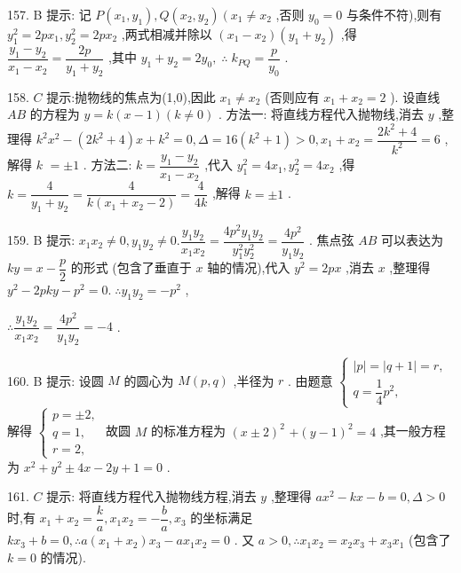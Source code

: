 157. B 提示: 记 $P\left( {{x}_{1},{y}_{1}}\right) ,Q\left( {{x}_{2},{y}_{2}}\right) \left( {{x}_{1} \neq  {x}_{2}}\right.$ ,否则 ${y}_{0} = 0$ 与条件不符),则有 ${y}_{1}^{2} = {2p}{x}_{1},{y}_{2}^{2} = {2p}{x}_{2}$ ,两式相减并除以 $\left( {{x}_{1} - {x}_{2}}\right) \left( {{y}_{1} + {y}_{2}}\right)$ ,得 $\dfrac{{y}_{1} - {y}_{2}}{{x}_{1} - {x}_{2}} = \dfrac{2p}{{y}_{1} + {y}_{2}}$ ,其中 ${y}_{1} + {y}_{2} = 2{y}_{0},\;\therefore \;{k}_{PQ} = \dfrac{p}{{y}_{0}}$ .

158. $C$ 提示:抛物线的焦点为(1,0),因此 ${x}_{1} \neq  {x}_{2}$ (否则应有 ${x}_{1} + {x}_{2} = 2$ ). 设直线 ${AB}$ 的方程为 $y = k\left( {x - 1}\right) \left( {k \neq  0}\right)$ . 方法一: 将直线方程代入抛物线,消去 $y$ ,整理得 ${k}^{2}{x}^{2} - \left( {2{k}^{2} + 4}\right) x + {k}^{2} = 0,\Delta  = {16}\left( {{k}^{2} + 1}\right)  > 0,{x}_{1} + {x}_{2} = \dfrac{2{k}^{2} + 4}{{k}^{2}} = 6$ ,解得 $k$  $=  \pm  1$ . 方法二: $k = \dfrac{{y}_{1} - {y}_{2}}{{x}_{1} - {x}_{2}}$ ,代入 ${y}_{1}^{2} = 4{x}_{1},{y}_{2}^{2} = 4{x}_{2}$ ,得 $k = \dfrac{4}{{y}_{1} + {y}_{2}} = \dfrac{4}{k\left( {{x}_{1} + {x}_{2} - 2}\right) } = \dfrac{4}{4k}$ ,解得 $k =  \pm  1$ .

159. B 提示: ${x}_{1}{x}_{2} \neq  0,{y}_{1}{y}_{2} \neq  0.\dfrac{{y}_{1}{y}_{2}}{{x}_{1}{x}_{2}} = \dfrac{4{p}^{2}{y}_{1}{y}_{2}}{{y}_{1}^{2}{y}_{2}^{2}} = \dfrac{4{p}^{2}}{{y}_{1}{y}_{2}}$ . 焦点弦 ${AB}$ 可以表达为 ${ky} = x - \dfrac{p}{2}$ 的形式 (包含了垂直于 $x$ 轴的情况),代入 ${y}^{2} = {2px}$ ,消去 $x$ ,整理得 ${y}^{2} - {2pky} - {p}^{2} = 0.\;\therefore {y}_{1}{y}_{2} =  - {p}^{2}$ ,

$\therefore \dfrac{{y}_{1}{y}_{2}}{{x}_{1}{x}_{2}} = \dfrac{4{p}^{2}}{{y}_{1}{y}_{2}} =  - 4$ .

160. B 提示: 设圆 $M$ 的圆心为 $M\left( {p,q}\right)$ ,半径为 $r$ . 由题意 $\left\{  \begin{array}{l} \left| p\right|  = \left| {q + 1}\right|  = r, \\  q = \dfrac{1}{4}{p}^{2}, \end{array}\right.$ 解得 $\left\{  \begin{array}{l} p =  \pm  2, \\  q = 1, \\  r = 2, \end{array}\right.$ 故圆 $M$ 的标准方程为 ${\left( x \pm  2\right) }^{2}$  $+ {\left( y - 1\right) }^{2} = 4$ ,其一般方程为 ${x}^{2} + {y}^{2} \pm  {4x} - {2y} + 1 = 0$ .

161. $C$ 提示: 将直线方程代入抛物线方程,消去 $y$ ,整理得 $a{x}^{2} - {kx} - b = 0,\Delta  > 0$ 时,有 ${x}_{1} + {x}_{2} = \dfrac{k}{a},{x}_{1}{x}_{2} =  - \dfrac{b}{a},{x}_{3}$ 的坐标满足 $k{x}_{3} + b = 0,\therefore a\left( {{x}_{1} + {x}_{2}}\right) {x}_{3} - a{x}_{1}{x}_{2} = 0$ . 又 $a > 0,\therefore {x}_{1}{x}_{2} = {x}_{2}{x}_{3} + {x}_{3}{x}_{1}$ (包含了 $k = 0$ 的情况).


